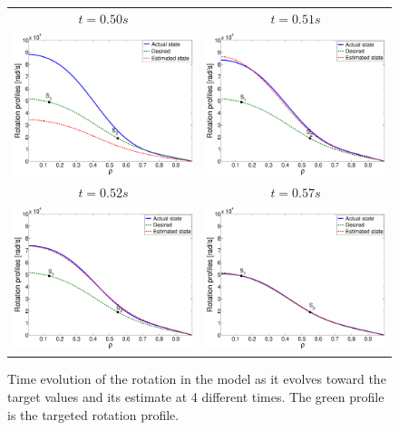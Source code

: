 \documentclass[12pt]{iopart}
\begin{document}
\begin{figure}
\begin{tabular}{cc}
$t = 0.50 s$  & $t = 0.51 s$ \\
\includegraphics[width=0.5\linewidth]{imene_figs/Goum18lnn} & %
\includegraphics[width= 0.5\linewidth]{imene_figs/Goum18lln} \\ %
$t = 0.52 s$  & $t = 0.57 s$ \\
\includegraphics[width=0.5\linewidth]{imene_figs/Goum18llln} &%
\includegraphics[width=0.5\linewidth]{imene_figs/Goum18lllln} %
\end{tabular}
\caption{Time evolution of the rotation in the model as it evolves toward the target values and its estimate at 4 different times. The green profile is the targeted rotation profile. }
\label{fig:rot18}
\end{figure}
\end{document}
